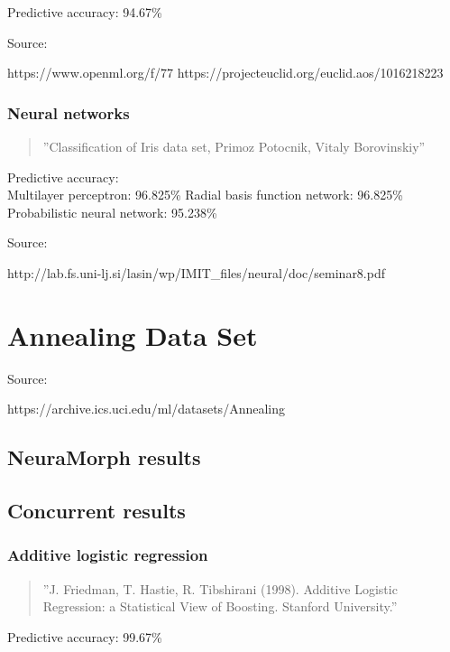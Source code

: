 \documentclass[8pt, a4paper]{article}
\begin{document}
Predictive accuracy: 94.67\%

Source:

https://www.openml.org/f/77
https://projecteuclid.org/euclid.aos/1016218223

\subsubsection{Neural networks}

\begin{quote}
''Classification of Iris data set, Primoz Potocnik, Vitaly Borovinskiy''
\end{quote}

Predictive accuracy:\\
Multilayer perceptron: 96.825\%
Radial basis function network: 96.825\%
Probabilistic neural network: 95.238\%

Source:

http://lab.fs.uni-lj.si/lasin/wp/IMIT\_files/neural/doc/seminar8.pdf




\newpage
\section{Annealing Data Set}

Source: 

https://archive.ics.uci.edu/ml/datasets/Annealing

\subsection{NeuraMorph results}



\subsection{Concurrent results}

\subsubsection{Additive logistic regression}

\begin{quote}
''J. Friedman, T. Hastie, R. Tibshirani (1998). Additive Logistic Regression: a Statistical View of Boosting. Stanford University.''
\end{quote}

Predictive accuracy: 99.67\%
\end{document}

